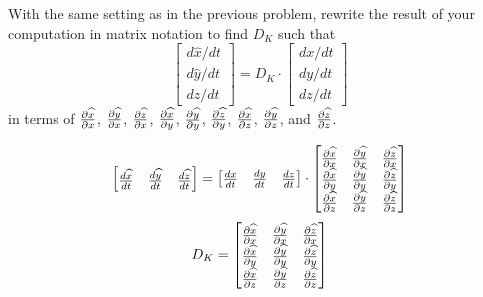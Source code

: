 \documentclass[newpage,hints,handout]{ximera}
\begin{document}
\begin{problem}
  With the same setting as in the previous problem, rewrite the result
  of your computation in matrix notation to find $D_K$ such that
\[
\begin{bmatrix}
d\hat{x}/dt \\ d\hat{y}/dt \\ d\hat{z}/dt%
\end{bmatrix}
=D_K \cdot \begin{bmatrix}
dx/dt \\ dy/dt \\ dz/dt
\end{bmatrix}
\]
in terms of $\pp[\hat x]{x}$, $\pp[\hat y]{x}$, $\pp[\hat z]{x}$,
$\pp[\hat x]{y}$, $\pp[\hat y]{y}$, $\pp[\hat z]{y}$, $\pp[\hat x]{z}$,
$\pp[\hat y]{z}$, and $\pp[\hat z]{z}$.

\begin{freeResponse}
\[
\begin{bmatrix}
\frac{d\hat{x}}{dt} & \frac{d\hat{y}}{dt} & \frac{d\hat{z}}{dt}%
\end{bmatrix}
=
\begin{bmatrix}
\frac{dx}{dt} & \frac{dy}{dt} & \frac{dz}{dt}%
\end{bmatrix}\cdot
\begin{bmatrix}
\pp[\hat x]{x} & \pp[\hat y]{x} & \pp[\hat z]{x} \\
\pp[\hat x]{y} & \pp[\hat y]{y} & \pp[\hat z]{y} \\
\pp[\hat x]{z} &\pp[\hat y]{z} & \pp[\hat z]{z}
\end{bmatrix}
\]
\[
D_K = 
\begin{bmatrix}
\pp[\hat x]{x} & \pp[\hat y]{x} & \pp[\hat z]{x} \\
\pp[\hat x]{y} & \pp[\hat y]{y} & \pp[\hat z]{y} \\
\pp[\hat x]{z} &\pp[\hat y]{z} & \pp[\hat z]{z}
\end{bmatrix}
\]

\end{freeResponse}
\end{problem}
\end{document}
